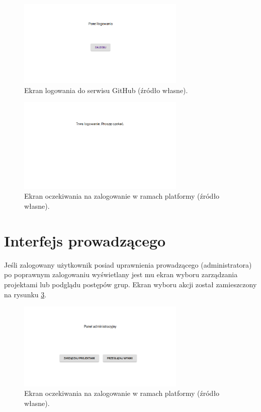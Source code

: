 \begin{figure}[h]
    \centering
    \includegraphics[width = 8cm]{chapter04/log_in_button.png}
    \caption{Ekran logowania do serwisu GitHub (źródło własne).}
    \label{fig:log_in_butoon}
\end{figure}

\begin{figure}[H]
    \centering
    \includegraphics[width = 8cm]{chapter04/wait_for_login.png}
    \caption{Ekran oczekiwania na zalogowanie w ramach platformy (źródło własne).}
    \label{fig:wait_for_login}
\end{figure}

\section{Interfejs prowadzącego}

Jeśli zalogowany użytkownik posiad uprawnienia prowadzącego (administratora) po poprawnym zalogowaniu wyświetlany jest mu ekran wyboru zarządzania projektami lub podglądu postępów grup.
Ekran wyboru akcji został zamieszczony na rysunku \ref{fig:lecturer_actions}.

\begin{figure}[h]
    \centering
    \includegraphics[width = 8cm]{chapter04/lecturer_actions.png}
    \caption{Ekran oczekiwania na zalogowanie w ramach platformy (źródło własne).}
    \label{fig:lecturer_actions}
\end{figure}

